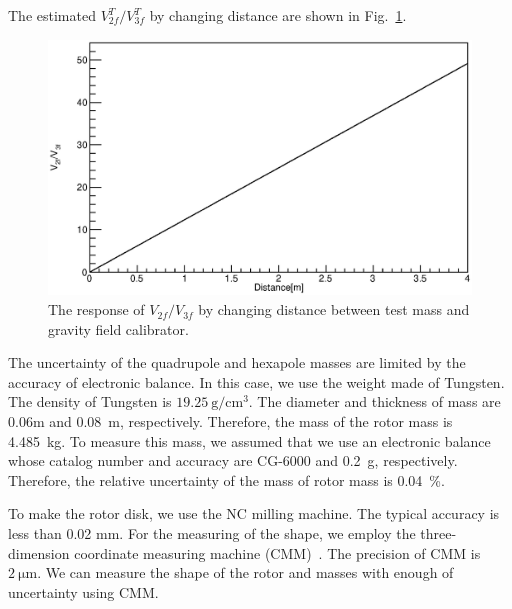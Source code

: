 \documentclass[A4]{spie}  %
\begin{document}
The estimated $V^T_{2f}/V^{T}_{3f}$ by changing distance are shown in Fig.~\ref{fig:dvsVV}.

\begin{figure}
\begin{center}
\includegraphics[width=12cm]{dvsVV.eps}
\caption{The response of $V_{2f}/V_{3f}$ by changing distance between test mass and gravity field calibrator.}
\label{fig:dvsVV}
\end{center}
\end{figure}
The uncertainty of the quadrupole and hexapole masses are limited by the accuracy of electronic balance. In this case, we use the weight made of Tungsten. The density of Tungsten is $19.25~\mathrm{g/cm^3}$. The diameter and thickness of mass are 0.06m and 0.08~m, respectively. Therefore, the mass of the rotor mass is 4.485~kg. To measure this mass, we assumed that we use an electronic balance whose catalog number and accuracy are CG-6000 and 0.2~g, respectively. Therefore, the relative uncertainty of the mass of rotor mass is 0.04~\%.

 To make the rotor disk, we use the NC milling machine. The typical accuracy is less than 0.02 mm. For the measuring of the shape, we employ the three-dimension coordinate measuring machine (CMM)~\cite{Inoue:2016kyq}. The precision of CMM is $2~\mathrm{\mu m}$. We can measure the shape of the rotor and masses with enough of uncertainty using CMM. 
\end{document}
